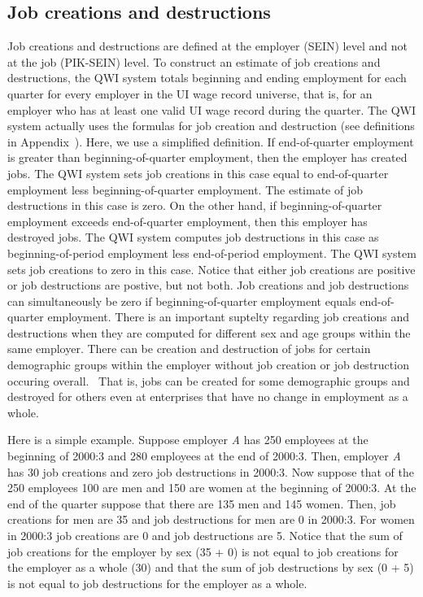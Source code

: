 \subsection{Job creations and destructions}

 
Job creations and destructions are defined at the employer (SEIN)
level and not at the job (PIK-{SEIN}) level. To construct an
estimate of job creations and destructions, the QWI system totals beginning
and ending employment for each quarter for every employer in the UI
wage record universe, that is, for an employer who has at least one valid %
{UI} wage record during the quarter. The QWI system actually uses the %
\Cite{DavisHaltiwangerSchuh} formulas for job creation and destruction
(see definitions in Appendix~). 
Here, we use a
simplified definition. If end-of-quarter employment is
greater than beginning-of-quarter employment, then the employer has created
jobs. The QWI system sets job creations in this case equal to end-of-quarter
employment less beginning-of-quarter employment. The estimate of job
destructions in this case is zero. On the other hand, if
beginning-of-quarter employment exceeds end-of-quarter employment, then this
employer has destroyed jobs. The QWI system computes job destructions in
this case as beginning-of-period employment less end-of-period employment.
The QWI system sets job creations to zero in this case. Notice that either
job creations are positive or job destructions are postive, but not both.
Job creations and job destructions can simultaneously be zero if
beginning-of-quarter employment equals end-of-quarter employment. There is
an important suptelty regarding job creations and destructions when they are
computed for different sex and age groups within the same employer. There
can be creation and destruction of jobs for certain demographic groups
within the employer without job creation or job destruction occuring
overall. \ That is, jobs can be created for some demographic groups and
destroyed for others even at enterprises that have no change in employment
as a whole.

Here is a simple example. Suppose employer \textit{A} has 250 employees at
the beginning of 2000:3 and 280 employees at the end of 2000:3. Then,
employer \textit{A} has 30 job creations and zero job destructions in
2000:3. Now suppose that of the 250 employees 100 are men and 150 are women
at the beginning of 2000:3. At the end of the quarter suppose that there are
135 men and 145 women. Then, job creations for men are 35 and job
destructions for men are 0 in 2000:3. For women in 2000:3 job creations are
0 and job destructions are 5. Notice that the sum of job creations for the
employer by sex (35 + 0) is not equal to job creations for the employer as a
whole (30) and that the sum of job destructions by sex (0 + 5) is not equal
to job destructions for the employer as a whole.

